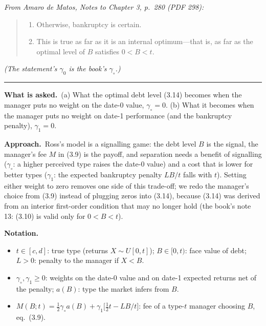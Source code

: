 \documentclass[11pt,a4paper]{article}
\newcommand{\notation}{\par\noindent\textbf{Notation.}}
\newcommand{\asked}{\par\medskip\noindent\textbf{What is asked.}~}
\newcommand{\approach}{\par\smallskip\noindent\textbf{Approach.}~}
\newcommand{\stmtend}{\par\endgroup\nopagebreak\noindent\rule{\linewidth}{0.4pt}\par\medskip}
\begin{document}
\emph{From Amaro de Matos, Notes to Chapter 3, p.~280 (PDF 298):}

\begin{quote}
\begin{enumerate}
\def\labelenumi{\arabic{enumi}.}
\setcounter{enumi}{11}
\item
  Otherwise, bankruptcy is certain.
\item
  This is true as far as it is an internal optimum---that is, as far as the optimal level of \(B\)
  satisfies \(0 < B < t\).
\end{enumerate}
\end{quote}

\emph{(The statement's \(\gamma_0\) is the book's \(\gamma_\circ\).)}
\stmtend

\asked (a) What the optimal debt level (3.14) becomes when the manager puts no weight on the date-0 value, $\gamma_\circ=0$. (b) What it becomes when the manager puts no weight on date-1 performance (and the bankruptcy penalty), $\gamma_1=0$.

\approach Ross's model is a signalling game: the debt level $B$ is the signal, the manager's fee $M$ in (3.9) is the payoff, and separation needs a benefit of signalling ($\gamma_\circ$: a higher perceived type raises the date-0 value) and a cost that is lower for better types ($\gamma_1$: the expected bankruptcy penalty $LB/t$ falls with $t$). Setting either weight to zero removes one side of this trade-off; we redo the manager's choice from (3.9) instead of plugging zeros into (3.14), because (3.14) was derived from an interior first-order condition that may no longer hold (the book's note 13: (3.10) is valid only for $0<B<t$).

\notation
\begin{itemize}
  \item $t\in[c,d]$: true type (returns $X\sim U[0,t]$); $B\in[0,t)$: face value of debt; $L>0$: penalty to the manager if $X<B$.
  \item $\gamma_\circ,\gamma_1\ge 0$: weights on the date-0 value and on date-1 expected returns net of the penalty; $a(B)$: type the market infers from $B$.
  \item $M(B;t)=\tfrac12\gamma_\circ a(B) + \gamma_1\bigl[\tfrac12 t - LB/t\bigr]$: fee of a type-$t$ manager choosing $B$, eq.~(3.9).
\end{itemize}
\end{document}
